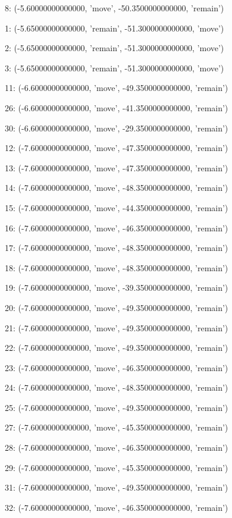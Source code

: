 8: (-5.60000000000000, 'move', -50.3500000000000, 'remain')


1: (-5.65000000000000, 'remain', -51.3000000000000, 'move')


2: (-5.65000000000000, 'remain', -51.3000000000000, 'move')


3: (-5.65000000000000, 'remain', -51.3000000000000, 'move')


11: (-6.60000000000000, 'move', -49.3500000000000, 'remain')


26: (-6.60000000000000, 'move', -41.3500000000000, 'remain')


30: (-6.60000000000000, 'move', -29.3500000000000, 'remain')


12: (-7.60000000000000, 'move', -47.3500000000000, 'remain')


13: (-7.60000000000000, 'move', -47.3500000000000, 'remain')


14: (-7.60000000000000, 'move', -48.3500000000000, 'remain')


15: (-7.60000000000000, 'move', -44.3500000000000, 'remain')


16: (-7.60000000000000, 'move', -46.3500000000000, 'remain')


17: (-7.60000000000000, 'move', -48.3500000000000, 'remain')


18: (-7.60000000000000, 'move', -48.3500000000000, 'remain')


19: (-7.60000000000000, 'move', -39.3500000000000, 'remain')


20: (-7.60000000000000, 'move', -49.3500000000000, 'remain')


21: (-7.60000000000000, 'move', -49.3500000000000, 'remain')


22: (-7.60000000000000, 'move', -49.3500000000000, 'remain')


23: (-7.60000000000000, 'move', -46.3500000000000, 'remain')


24: (-7.60000000000000, 'move', -48.3500000000000, 'remain')


25: (-7.60000000000000, 'move', -49.3500000000000, 'remain')


27: (-7.60000000000000, 'move', -45.3500000000000, 'remain')


28: (-7.60000000000000, 'move', -46.3500000000000, 'remain')


29: (-7.60000000000000, 'move', -45.3500000000000, 'remain')


31: (-7.60000000000000, 'move', -49.3500000000000, 'remain')


32: (-7.60000000000000, 'move', -46.3500000000000, 'remain')


